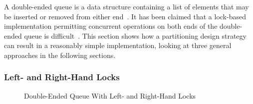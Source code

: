 A double-ended queue is a data structure containing a list of elements
that may be inserted or removed from either end~\cite{Knuth73}.
It has been claimed that a lock-based implementation permitting
concurrent operations on both ends of the double-ended queue is
difficult~\cite{DanGrossman2007TMGCAnalogy}.
This section shows how a partitioning design strategy can result
in a reasonably simple implementation, looking at three
general approaches in the following sections.
\fi

\subsubsection{Left- and Right-Hand Locks}
\label{sec:SMPdesign:Left- and Right-Hand Locks}

\begin{figure}[tb]
\centering
{}
\caption{Double-Ended Queue With Left- and Right-Hand Locks}
\label{fig:SMPdesign:Double-Ended Queue With Left- and Right-Hand Locks}
\end{figure}

